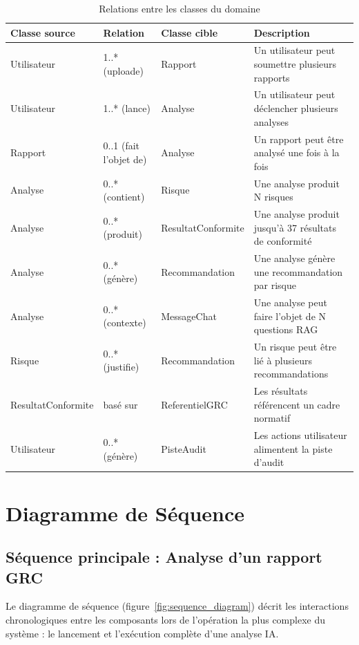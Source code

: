 \begin{table}[htbp]
  \centering
  \caption{Relations entre les classes du domaine}
  \begin{tabular}{p{3.2cm}p{3.8cm}p{3.2cm}p{4.8cm}}
    \toprule
    \textbf{Classe source} & \textbf{Relation} & \textbf{Classe cible} & \textbf{Description} \\
    \midrule
    Utilisateur & 1..* (uploade) & Rapport & Un utilisateur peut soumettre plusieurs rapports \\
    Utilisateur & 1..* (lance) & Analyse & Un utilisateur peut déclencher plusieurs analyses \\
    Rapport & 0..1 (fait l'objet de) & Analyse & Un rapport peut être analysé une fois à la fois \\
    Analyse & 0..* (contient) & Risque & Une analyse produit N risques \\
    Analyse & 0..* (produit) & ResultatConformite & Une analyse produit jusqu'à 37 résultats de conformité \\
    Analyse & 0..* (génère) & Recommandation & Une analyse génère une recommandation par risque \\
    Analyse & 0..* (contexte) & MessageChat & Une analyse peut faire l'objet de N questions RAG \\
    Risque & 0..* (justifie) & Recommandation & Un risque peut être lié à plusieurs recommandations \\
    ResultatConformite & basé sur & ReferentielGRC & Les résultats référencent un cadre normatif \\
    Utilisateur & 0..* (génère) & PisteAudit & Les actions utilisateur alimentent la piste d'audit \\
    \bottomrule
  \end{tabular}
\end{table}

\section{Diagramme de Séquence}

\subsection{Séquence principale : Analyse d'un rapport GRC}

Le diagramme de séquence (figure~\ref{fig:sequence_diagram}) décrit les
interactions chronologiques entre les composants lors de l'opération la
plus complexe du système : le lancement et l'exécution complète d'une
analyse IA.

